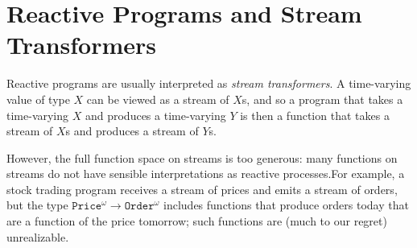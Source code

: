 \documentclass[nocopyrightspace,preprint]{sigplanconf}
\newcommand{\term}[1]{\ensuremath{\mathtt{{#1}}}}
\newcounter{lineno}
\newenvironment{tabbingspec}{\setcounter{lineno}{0}\begin{tabbing}\refstepcounter{lineno}{\small \arabic{lineno}}\;\;\;\=}{\end{tabbing}}
\newcommand{\Newline}[1][0em]{\refstepcounter{lineno}\\[#1]{\small \arabic{lineno}}\>}
\begin{document}

\section{Reactive Programs and Stream Transformers}

Reactive programs are usually interpreted as \emph{stream
  transformers}. A time-varying value of type $X$ can
be viewed as a stream of $X$s, and so a program that takes a
time-varying $X$ and produces a time-varying $Y$ is then a function
that takes a stream of $X$s and produces a stream of $Y$s. 


However, the full function space on streams is too generous: many
functions on streams do not have sensible interpretations as reactive
processes.For example, a stock trading program receives a stream of
prices and emits a stream of orders, but the type
\term{Price^\omega\to Order^\omega} includes functions that produce
orders today that are a function of the price tomorrow; such functions
are (much to our regret) unrealizable.



\end{document}
